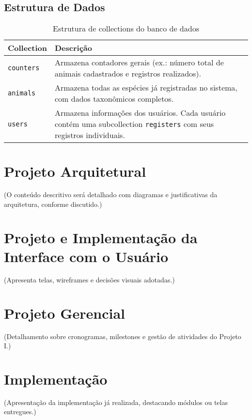 \subsection{Estrutura de Dados}

\begin{table}[H]
    \centering
    \caption{Estrutura de collections do banco de dados}
    \label{tab:estrutura-dados}
    \begin{tabular}{|p{3cm}|p{10cm}|}
    \hline
    \textbf{Collection} & \textbf{Descrição} \\ \hline
    \texttt{counters} & Armazena contadores gerais (ex.: número total de animais cadastrados e registros realizados). \\ \hline
    \texttt{animals} & Armazena todas as espécies já registradas no sistema, com dados taxonômicos completos. \\ \hline
    \texttt{users} & Armazena informações dos usuários. Cada usuário contém uma subcollection \texttt{registers} com seus registros individuais. \\ \hline
    \end{tabular}
\end{table}
    

\section{Projeto Arquitetural}

(O conteúdo descritivo será detalhado com diagramas e justificativas da arquitetura, conforme discutido.)

\section{Projeto e Implementação da Interface com o Usuário}

(Apresenta telas, wireframes e decisões visuais adotadas.)

\section{Projeto Gerencial}

(Detalhamento sobre cronogramas, milestones e gestão de atividades do Projeto I.)

\section{Implementação}

(Apresentação da implementação já realizada, destacando módulos ou telas entregues.)

